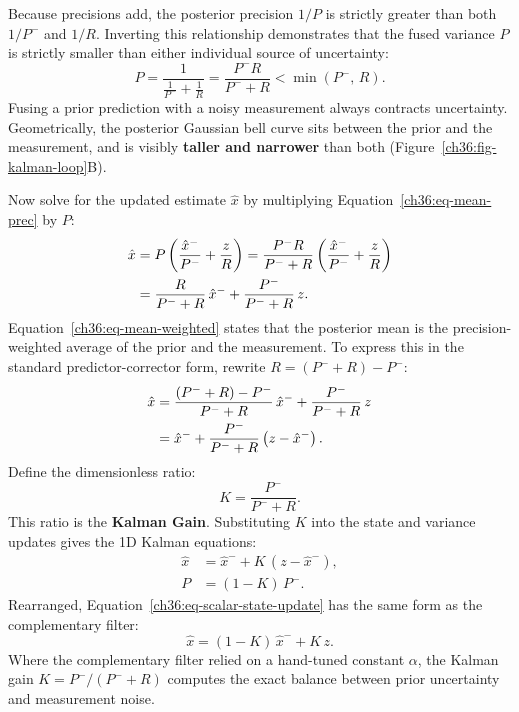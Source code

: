Because precisions add, the posterior precision $1/P$ is strictly greater than both $1/P^-$ and $1/R$. Inverting this relationship demonstrates that the fused variance $P$ is strictly smaller than either individual source of uncertainty:
\begin{equation}
  P = \frac{1}{\frac{1}{P^-} + \frac{1}{R}} = \frac{P^- R}{P^- + R} < \min\left(P^-,\, R\right) .
  \label{ch36:eq-fused-variance}
\end{equation}
Fusing a prior prediction with a noisy measurement always contracts uncertainty. Geometrically, the posterior Gaussian bell curve sits between the prior and the measurement, and is visibly \textbf{taller and narrower} than both (Figure~\ref{ch36:fig-kalman-loop}B).

Now solve for the updated estimate $\hat{x}$ by multiplying Equation~\eqref{ch36:eq-mean-prec} by $P$:
\begin{align}
  \hat{x} &= P \left( \frac{\hat{x}^-}{P^-} + \frac{z}{R} \right) = \frac{P^- R}{P^- + R} \left( \frac{\hat{x}^-}{P^-} + \frac{z}{R} \right) \notag \\
          &= \frac{R}{P^- + R}\, \hat{x}^- + \frac{P^-}{P^- + R}\, z .
  \label{ch36:eq-mean-weighted}
\end{align}
Equation~\eqref{ch36:eq-mean-weighted} states that the posterior mean is the precision-weighted average of the prior and the measurement. To express this in the standard predictor-corrector form, rewrite $R = (P^- + R) - P^-$:
\begin{align}
  \hat{x} &= \frac{(P^- + R) - P^-}{P^- + R}\, \hat{x}^- + \frac{P^-}{P^- + R}\, z \notag \\
          &= \hat{x}^- + \frac{P^-}{P^- + R} \left( z - \hat{x}^- \right) .
  \label{ch36:eq-kalman-form}
\end{align}
Define the dimensionless ratio:
\begin{equation}
  K = \frac{P^-}{P^- + R} .
  \label{ch36:eq-kalman-gain-scalar}
\end{equation}
This ratio is the \textbf{Kalman Gain}. Substituting $K$ into the state and variance updates gives the 1D Kalman equations:
\begin{align}
  \hat{x} &= \hat{x}^- + K\, (z - \hat{x}^-) , \label{ch36:eq-scalar-state-update} \\
  P &= (1 - K)\, P^- . \label{ch36:eq-scalar-cov-update}
\end{align}
Rearranged, Equation~\eqref{ch36:eq-scalar-state-update} has the same form as the complementary filter:
\[
  \hat{x} = (1 - K)\, \hat{x}^- + K\, z .
\]
Where the complementary filter relied on a hand-tuned constant $\alpha$, the Kalman gain $K = P^- / (P^- + R)$ computes the exact balance between prior uncertainty and measurement noise.

